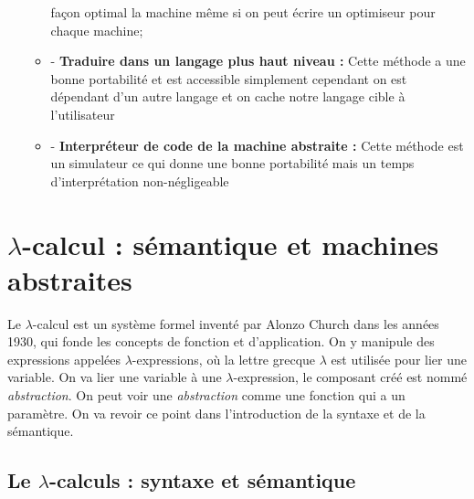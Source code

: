 \documentclass[10pt,a4paper]{report}
\begin{document}
\begin{itemize}
\begin{itemize}
    façon optimal la machine même si on peut écrire un optimiseur pour chaque machine;
  \item[] - \textbf{Traduire dans un langage plus haut niveau :} Cette méthode a une bonne portabilité et est accessible simplement cependant
    on est dépendant d'un autre langage et on cache notre langage cible à l'utilisateur
  \item[] - \textbf{Interpréteur de code de la machine abstraite :} Cette méthode est un simulateur ce qui donne une bonne portabilité mais un
    temps d'interprétation non-négligeable
  \end{itemize}
\end{itemize}

\section{$\lambda$-calcul : sémantique et machines abstraites}

Le $\lambda$-calcul est un système formel inventé par Alonzo Church dans les années 1930, qui fonde les concepts de fonction et
d'application. On y manipule des expressions appelées $\lambda$-expressions, où la lettre grecque $\lambda$ est utilisée pour lier une variable. On va lier une variable à une $\lambda$-expression, le composant créé est nommé \textit{abstraction}. On peut voir une \textit{abstraction} comme une fonction qui a un paramètre. On va revoir ce point dans l'introduction de la syntaxe et de la sémantique.
\subsection{Le $\lambda$-calculs : syntaxe et sémantique}
\end{document}
